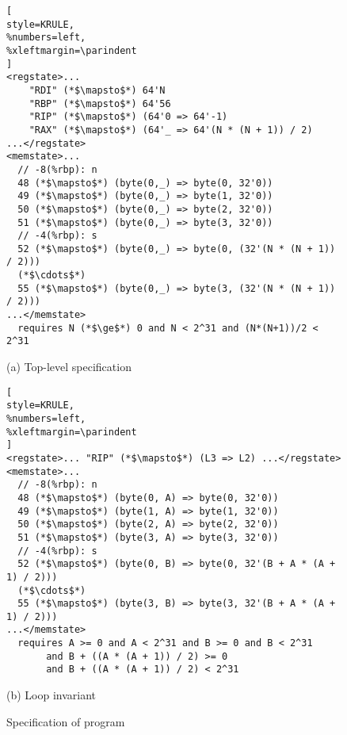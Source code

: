 

\setlength{\textfloatsep}{1\baselineskip plus 0.2\baselineskip minus 0.5\baselineskip}
\begin{figure}
\begin{lstlisting}[
style=KRULE,
%numbers=left,
%xleftmargin=\parindent
]
<regstate>... 
    "RDI" (*$\mapsto$*) 64'N
    "RBP" (*$\mapsto$*) 64'56
    "RIP" (*$\mapsto$*) (64'0 => 64'-1) 
    "RAX" (*$\mapsto$*) (64'_ => 64'(N * (N + 1)) / 2)
...</regstate>
<memstate>...
  // -8(%rbp): n
  48 (*$\mapsto$*) (byte(0,_) => byte(0, 32'0))
  49 (*$\mapsto$*) (byte(0,_) => byte(1, 32'0))
  50 (*$\mapsto$*) (byte(0,_) => byte(2, 32'0))
  51 (*$\mapsto$*) (byte(0,_) => byte(3, 32'0))
  // -4(%rbp): s
  52 (*$\mapsto$*) (byte(0,_) => byte(0, (32'(N * (N + 1)) / 2)))
  (*$\cdots$*)
  55 (*$\mapsto$*) (byte(0,_) => byte(3, (32'(N * (N + 1)) / 2)))
...</memstate>
  requires N (*$\ge$*) 0 and N < 2^31 and (N*(N+1))/2 < 2^31
\end{lstlisting}
\begin{center}
{\small (a) Top-level specification}
\end{center}
\begin{lstlisting}[
style=KRULE,
%numbers=left,
%xleftmargin=\parindent
]
<regstate>... "RIP" (*$\mapsto$*) (L3 => L2) ...</regstate>
<memstate>...
  // -8(%rbp): n
  48 (*$\mapsto$*) (byte(0, A) => byte(0, 32'0))
  49 (*$\mapsto$*) (byte(1, A) => byte(1, 32'0))
  50 (*$\mapsto$*) (byte(2, A) => byte(2, 32'0))
  51 (*$\mapsto$*) (byte(3, A) => byte(3, 32'0))
  // -4(%rbp): s
  52 (*$\mapsto$*) (byte(0, B) => byte(0, 32'(B + A * (A + 1) / 2)))
  (*$\cdots$*)
  55 (*$\mapsto$*) (byte(3, B) => byte(3, 32'(B + A * (A + 1) / 2)))
...</memstate>
  requires A >= 0 and A < 2^31 and B >= 0 and B < 2^31
       and B + ((A * (A + 1)) / 2) >= 0  
       and B + ((A * (A + 1)) / 2) < 2^31
\end{lstlisting}
\begin{center}
{\small (b) Loop invariant}
\end{center}
\caption{Specification of  program}
\label{fig:sum-to-n-spec}
\end{figure}

